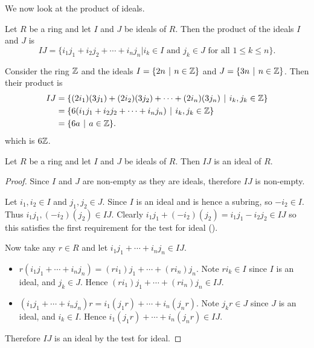 \newpage

We now look at the product of ideals.
\begin{definition}
    Let $R$ be a ring and let $I$ and $J$ be ideals of $R$. Then the product of the ideals $I$ and $J$ is
    \[
        IJ = \{i_1j_1 + i_2j_2 + \cdots + i_nj_n \vert i_k\in I \text{ and } j_k\in J \text{ for all } 1 \leq k \leq n\}.
    \]
\end{definition}

\begin{example}
    Consider the ring $\mathbb{Z}$ and the ideals $I = \{2n \vert n \in \Z\}$ and $J = \{3n \vert n \in \Z\}$. Then their product is
    \begin{align*}
        IJ &= \{(2i_1)(3j_1) + (2i_2)(3j_2) + \cdots + (2i_n)(3j_n) \vert i_k,j_k \in \Z\}\\
        &= \{6(i_1j_1 + i_2j_2 + \cdots + i_nj_n) \vert i_k,j_k \in \Z\}\\
        &= \{6a \vert a \in \Z\}.
    \end{align*}
    which is $6\mathbb{Z}$.
\end{example}

\begin{proposition}\label{prop-product-of-ideals-is-ideal}
    Let $R$ be a ring and let $I$ and $J$ be ideals of $R$. Then $IJ$ is an ideal of $R$.
\end{proposition}
\begin{proof}
    Since $I$ and $J$ are non-empty as they are ideals, therefore $IJ$ is non-empty.

    Let $i_1,i_2 \in I$ and $j_1,j_2 \in J$. Since $I$ is an ideal and is hence a subring, so $-i_2 \in I$. Thus $i_1j_1, (-i_2)(j_2) \in IJ$. Clearly $i_1j_1 + (-i_2)(j_2) = i_1j_1 - i_2j_2 \in IJ$ so this satisfies the first requirement for the test for ideal ().

    Now take any $r \in R$ and let $i_1j_1 + \cdots + i_nj_n \in IJ$.
    \begin{itemize}
        \item $r(i_1j_1 + \cdots + i_nj_n) = (ri_1)j_1 + \cdots + (ri_n)j_n$. Note $ri_k \in I$ since $I$ is an ideal, and $j_k \in J$. Hence $(ri_1)j_1 + \cdots + (ri_n)j_n \in IJ$.
        \item $(i_1j_1 + \cdots + i_nj_n)r = i_1(j_1r) + \cdots + i_n(j_nr)$. Note $j_kr \in J$ since $J$ is an ideal, and $i_k \in I$. Hence $i_1(j_1r) + \cdots + i_n(j_nr) \in IJ$.
    \end{itemize}

    Therefore $IJ$ is an ideal by the test for ideal.
\end{proof}

